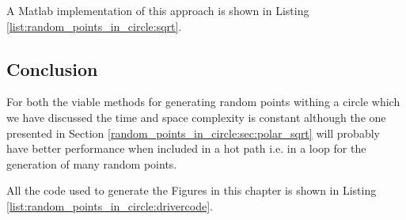 A Matlab implementation of this approach is shown in Listing \ref{list:random_points_in_circle:sqrt}.



\subsection{Conclusion}
For both the viable methods for generating random points withing a circle which we have discussed the time and space complexity is constant although the one presented in Section \ref{random_points_in_circle:sec:polar_sqrt} will probably have better performance when included in a hot path i.e. in a loop for the generation of many random points.

All the code used to generate the Figures in this chapter is shown in Listing \ref{list:random_points_in_circle:drivercode}.


